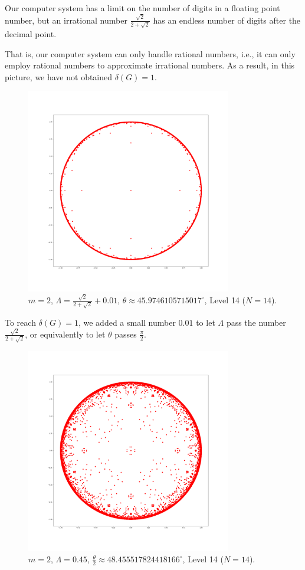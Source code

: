 \documentclass[12pt,oneside]{sfsuthesis}
\theoremstyle{plain} %
\theoremstyle{definition}  %
\theoremstyle{remark}  %
\theoremstyle{plain}
\begin{document}
{Our computer system has a limit on the number of digits in a floating point number, but an irrational number $\frac{\sqrt{2}}{2+\sqrt{2}}$ has an endless number of digits after the decimal point.

That is, our computer system can only handle rational numbers, i.e., it can only employ rational numbers to approximate irrational numbers. As a result, in this picture, we have not obtained $\delta(G)=1$.

\begin{figure}[H]
\centering
\includegraphics[width=0.8\textwidth]{Lambda=r+0.01,m=2,N=14.png}
\caption{$m=2$, $\Lambda=\frac{\sqrt{2}}{2+\sqrt{2}}+0.01$, $\theta\approx 45.9746105715017^{\circ}$, Level 14 ($N=14$).}
\end{figure}
To reach $\delta(G)=1$, we added a small number $0.01$ to let $\Lambda$ pass the number $\frac{\sqrt{2}}{2+\sqrt{2}}$, or equivalently to let $\theta$ passes $\frac{\pi}{2}$.

\begin{figure}[H]
\centering
\includegraphics[width=0.8\textwidth]{Lambda=0.45,m=2,N=14.png}
\caption{$m=2$, $\Lambda=0.45$, $\frac{\theta}{2}\approx 48.455517824418166^{\circ}$, Level 14 ($N=14$).}
\end{figure}

}
\end{document}
